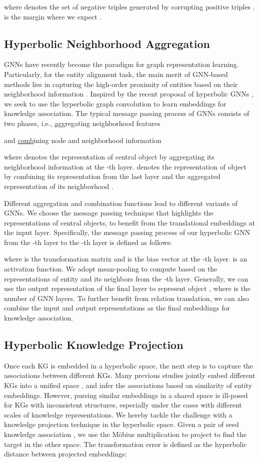 \documentclass[11pt,a4paper]{article}
\begin{document}
where  denotes the set of negative triples generated by corrupting positive triples \cite{BootEA}.  is the margin where we expect . 

\subsection{Hyperbolic Neighborhood Aggregation}
GNNs \cite{GCN} have recently become the paradigm for graph representation learning. Particularly, for the entity alignment task, the main merit of GNN-based methods lies in capturing the high-order proximity of entities based on their neighborhood information \cite{GCN_Align}. Inspired by the recent proposal of hyperbolic GNNs \cite{HGCN,HGCNN}, we seek to use the hyperbolic graph convolution to learn embeddings for knowledge association. The typical message passing process of GNNs consists of two phases, i.e., \underline{agg}regating neighborhood features

and \underline{comb}ining node and neighborhood information

where  denotes the representation of central object  by aggregating its neighborhood information  at the -th layer.  denotes the representation of object  by combining its representation from the last layer  and the aggregated representation of its neighborhood . 

Different aggregation and combination functions lead to different variants of GNNs. We choose the message passing technique that highlights the representations of central objects, to benefit from the translational embeddings at the input layer. Specifically, the message passing process of our hyperbolic GNN from the -th layer to the -th layer is defined as follows:


\noindent
where  is the transformation matrix and  is the bias vector at the -th layer.  is an activation function. We adopt mean-pooling to compute  based on the representations of entity  and its neighbors from the -th layer. Generally, we can use the output representation of the final layer  to represent object , where  is the number of GNN layers. To further benefit from relation translation, we can also combine the input and output representations  as the final embeddings for knowledge association.

\subsection{Hyperbolic Knowledge Projection}
Once each KG is embedded in a hyperbolic space, the next step is to capture the associations between different KGs. Many previous studies jointly embed different KGs into a unified space \cite{JAPE,GCN_Align,KECG}, and infer the associations based on similarity of entity embeddings. However, pursing similar embeddings in a shared space is ill-posed for KGs with inconsistent structures, especially under the cases with different scales of knowledge representations. We hereby tackle the challenge with a knowledge projection technique in the hyperbolic space. Given a pair of seed knowledge association , we use the M\"obius multiplication to project  to find the target  in the other space. The transformation error is defined as the hyperbolic distance between projected embeddings:
\end{document}
